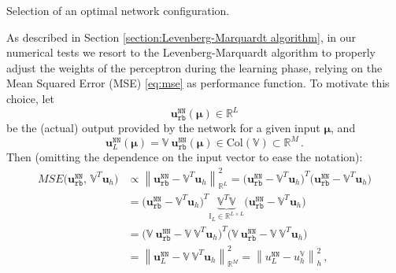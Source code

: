 \documentclass[12pt, a4paper, twoside, openright, notitlepage]{report}
\numberwithin{equation}{chapter}
\theoremstyle{theorem}
\theoremstyle{definition}
\theoremstyle{remark}
\theoremstyle{proposition}
\numberwithin{figure}{chapter}
\newcommand{\norm}[1]{\left\lVert#1\right\rVert}
\newcommand{\bg}[1]{\boldsymbol{#1}}
\begin{document}
\begin{algorithm}[H]
\begin{algorithmic}[1]
			\end{algorithmic}
			
			\caption{Selection of an optimal network configuration.}
			\label{alg:podnn-training}
		\end{algorithm}
								
		\noindent As described in Section \ref{section:Levenberg-Marquardt algorithm}, in our numerical tests we resort to the Levenberg-Marquardt algorithm to properly adjust the weights of the perceptron during the learning phase, relying on the Mean Squared Error (MSE) \eqref{eq:mse} as performance function. To motivate this choice, let 
		\begin{equation*}
			\mathbf{u}_{\texttt{rb}}^{\texttt{NN}}(\bg{\mu}) \in \mathbb{R}^L
		\end{equation*}
		be the (actual) output provided by the network for a given input $\bg{\mu}$, and 
		\begin{equation*}
			\mathbf{u}_L^{\texttt{NN}}(\bg{\mu}) = \mathbb{V} ~ \mathbf{u}_{\texttt{rb}}^{\texttt{NN}}(\bg{\mu}) \in \text{Col}(\mathbb{V}) \subset \mathbb{R}^M \, . 
		\end{equation*}
		Then (omitting the dependence on the input vector to ease the notation):
		\begin{equation}
			\label{eq:pod-nn-mse}
			\begin{aligned}
				MSE \big( \mathbf{u}_{\texttt{rb}}^{\texttt{NN}}, \, \mathbb{V}^T \mathbf{u}_h \big) & \propto \norm{\mathbf{u}_{\texttt{rb}}^{\texttt{NN}} - \mathbb{V}^T \mathbf{u}_h}^2_{\mathbb{R}^L} = \big( \mathbf{u}_{\texttt{rb}}^{\texttt{NN}} - \mathbb{V}^T \mathbf{u}_h \big)^T \big( \mathbf{u}_{\texttt{rb}}^{\texttt{NN}} - \mathbb{V}^T \mathbf{u}_h \big) \\
				& = \big( \mathbf{u}_{\texttt{rb}}^{\texttt{NN}} - \mathbb{V}^T \mathbf{u}_h \big)^T \underbrace{\mathbb{V}^T \mathbb{V}}_{\mathbb{I}_L \in \mathbb{R}^{L \times L}} \big( \mathbf{u}_{\texttt{rb}}^{\texttt{NN}} - \mathbb{V}^T \mathbf{u}_h \big) \\
				& = \big( \mathbb{V} ~ \mathbf{u}_{\texttt{rb}}^{\texttt{NN}} - \mathbb{V} ~ \mathbb{V}^T \mathbf{u}_h \big)^T \big( \mathbb{V} ~ \mathbf{u}_{\texttt{rb}}^{\texttt{NN}} - \mathbb{V} ~ \mathbb{V}^T \mathbf{u}_h \big) \\
				& = \norm{\mathbf{u}_L^{\texttt{NN}} - \mathbb{V} ~ \mathbb{V}^T \mathbf{u}_h}^2_{\mathbb{R}^M} = \norm{u_L^{\texttt{NN}} - u_h^{\mathbb{V}}}^2_h \, ,
			\end{aligned}
		\end{equation} 
\end{document}
